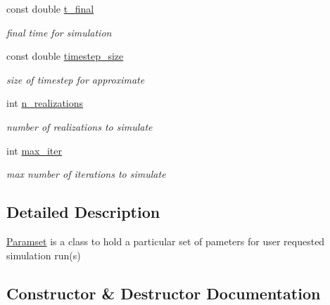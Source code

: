 \begin{DoxyCompactItemize}
\mbox{\label{class_paramset_ac88cde461d8dbbd8a7d2636fc45f7119}} 
const double \hyperlink{class_paramset_ac88cde461d8dbbd8a7d2636fc45f7119}{t\+\_\+final}
\begin{DoxyCompactList}\small\item\em final time for simulation \end{DoxyCompactList}\item 
\mbox{\label{class_paramset_a0554913cf803a67bc59ffdee154abc24}} 
const double \hyperlink{class_paramset_a0554913cf803a67bc59ffdee154abc24}{timestep\+\_\+size}
\begin{DoxyCompactList}\small\item\em size of timestep for approximate \end{DoxyCompactList}\item 
\mbox{\label{class_paramset_a50c0325e75983b66d0825406ec7873ac}} 
int \hyperlink{class_paramset_a50c0325e75983b66d0825406ec7873ac}{n\+\_\+realizations}
\begin{DoxyCompactList}\small\item\em number of realizations to simulate \end{DoxyCompactList}\item 
\mbox{\label{class_paramset_afeb86c327cd6966707996019609e6ed1}} 
int \hyperlink{class_paramset_afeb86c327cd6966707996019609e6ed1}{max\+\_\+iter}
\begin{DoxyCompactList}\small\item\em max number of iterations to simulate \end{DoxyCompactList}\end{DoxyCompactItemize}


\subsection{Detailed Description}
\hyperlink{class_paramset}{Paramset} is a class to hold a particular set of pameters for user requested simulation run(s) 

\subsection{Constructor \& Destructor Documentation}
\mbox{\label{class_paramset_a2893c9f0d0ad896fd1f55d4cda734cbd}} 
